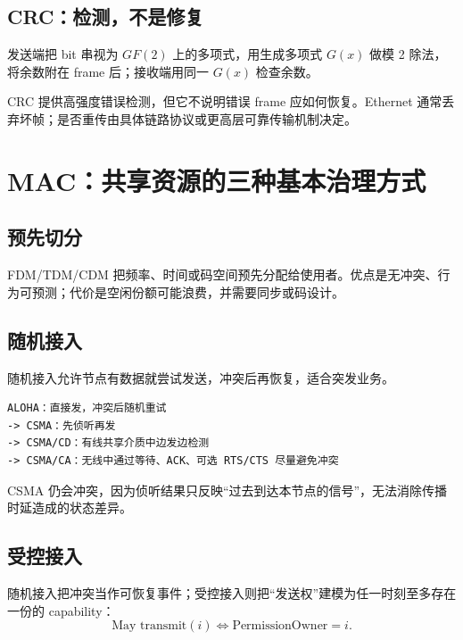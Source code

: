 \documentclass[UTF8,fontset=none,11pt,a4paper]{ctexart}
\begin{document}
\subsection{CRC：检测，不是修复}\label{32-crcux68c0ux6d4bux4e0dux662fux4feeux590d}

发送端把 bit 串视为 \(GF(2)\) 上的多项式，用生成多项式 \(G(x)\) 做模 2
除法，将余数附在 frame 后；接收端用同一 \(G(x)\) 检查余数。

CRC 提供高强度错误检测，但它不说明错误 frame 应如何恢复。Ethernet
通常丢弃坏帧；是否重传由具体链路协议或更高层可靠传输机制决定。

\section{MAC：共享资源的三种基本治理方式}\label{4-macux5171ux4eabux8d44ux6e90ux7684ux4e09ux79cdux57faux672cux6cbbux7406ux65b9ux5f0f}

\subsection{预先切分}\label{41-ux9884ux5148ux5207ux5206}

FDM/TDM/CDM
把频率、时间或码空间预先分配给使用者。优点是无冲突、行为可预测；代价是空闲份额可能浪费，并需要同步或码设计。

\subsection{随机接入}\label{42-ux968fux673aux63a5ux5165}

随机接入允许节点有数据就尝试发送，冲突后再恢复，适合突发业务。

\begin{lstlisting}
ALOHA：直接发，冲突后随机重试
-> CSMA：先侦听再发
-> CSMA/CD：有线共享介质中边发边检测
-> CSMA/CA：无线中通过等待、ACK、可选 RTS/CTS 尽量避免冲突
\end{lstlisting}

CSMA
仍会冲突，因为侦听结果只反映``过去到达本节点的信号''，无法消除传播时延造成的状态差异。

\subsection{受控接入}\label{43-ux53d7ux63a7ux63a5ux5165}

随机接入把冲突当作可恢复事件；受控接入则把“发送权”建模为任一时刻至多存在一份的 capability：
\[
\boxed{\text{May transmit}(i)\iff \text{PermissionOwner}=i}.
\]
\end{document}

